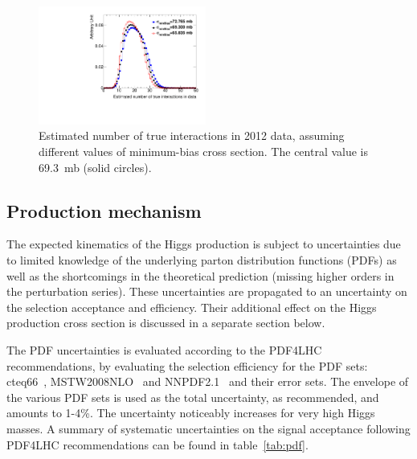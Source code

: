 \begin{figure}[bh]
\centering
\includegraphics[width=0.49\textwidth]{plots/data_pileup.pdf}
\caption{Estimated number of true interactions in 2012 data, assuming different values of minimum-bias cross section. The central value is 69.3~mb (solid circles).}
\label{fig:shiftedDataPileup}
\end{figure}


\subsection{Production mechanism}

The expected kinematics of the Higgs production is subject to uncertainties due to limited knowledge of  the underlying parton distribution functions (PDFs) as well as the shortcomings in the theoretical prediction (missing higher orders in the perturbation series). These uncertainties are propagated to an uncertainty on the selection acceptance and efficiency. Their additional effect on the Higgs production cross section is discussed in a separate section below.

The PDF uncertainties is evaluated according to the PDF4LHC recommendations, by evaluating the selection efficiency for the PDF sets: cteq66~\cite{cteq}, MSTW2008NLO~\cite{MSTW} and  NNPDF2.1~\cite{NNPDF} and their error sets. The envelope of the various PDF sets is used as the total uncertainty, as recommended, and amounts to 1-4\%. The uncertainty noticeably increases for very high Higgs masses. A summary of systematic uncertainties on the signal acceptance following PDF4LHC recommendations can be found in table~\ref{tab:pdf}.

